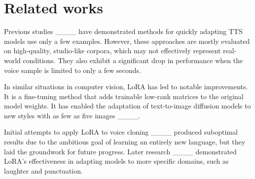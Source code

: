 \section{Related works}
Previous studies ____ have demonstrated methods for quickly adapting 
TTS models use only a few examples. However, these approaches are mostly evaluated on high-quality, 
studio-like corpora, which may not effectively represent real-world conditions. They also exhibit a significant 
drop in performance when the voice sample is limited to only a few seconds.

In similar situations in computer vision, LoRA has led to notable improvements. It is a fine-tuning method 
that adds trainable low-rank matrices to the original model weights. It has enabled the adaptation of text-to-image 
diffusion models to new styles with as few as five images ____.

Initial attempts to apply LoRA to voice cloning ____ produced suboptimal results due to the ambitious goal 
of learning an entirely new language, but they laid the groundwork for future progress. Later research ____ 
demonstrated LoRA's effectiveness in adapting models to more specific domains, such as laughter and punctuation.

%